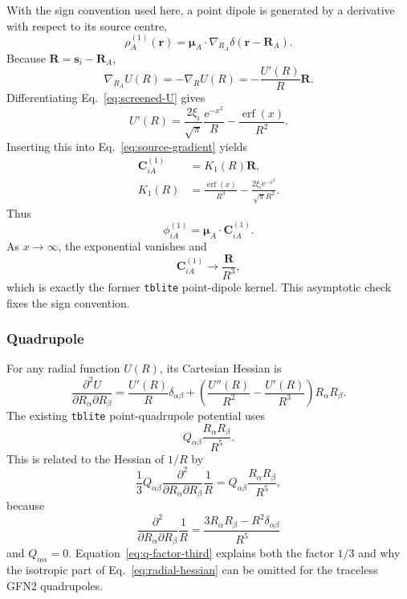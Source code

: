 \documentclass[11pt,a4paper]{article}
\newcommand{\vect}[1]{\bm{#1}}
\newcommand{\erf}{\operatorname{erf}}
\newcommand{\ee}{\mathrm{e}}
\begin{document}
With the sign convention used here, a point dipole is generated by a derivative
with respect to its source centre,
\begin{equation}
 \rho_A^{(1)}(\vect r)
 =\vect\mu_A\mathbin{\cdot}\nabla_{R_A}
   \delta(\vect r-\vect R_A).
\end{equation}
Because $\vect R=\vect s_i-\vect R_A$,
\begin{equation}
 \nabla_{R_A}U(R)=-\nabla_RU(R)=-\frac{U'(R)}{R}\vect R.
 \label{eq:source-gradient}
\end{equation}
Differentiating Eq.~\eqref{eq:screened-U} gives
\begin{equation}
 U'(R)=\frac{2\xi_i}{\sqrt\pi}\frac{\ee^{-x^2}}{R}
       -\frac{\erf(x)}{R^2}.
\end{equation}
Inserting this into Eq.~\eqref{eq:source-gradient} yields
\begin{align}
 \vect C_{iA}^{(1)}&=K_1(R)\vect R,\\
 K_1(R)&=
 \frac{\erf(x)}{R^3}
 -\frac{2\xi_i\ee^{-x^2}}{\sqrt\pi R^2}.
 \label{eq:k1}
\end{align}
Thus
\begin{equation}
 \phi_{iA}^{(1)}=\vect\mu_A\mathbin{\cdot}\vect C_{iA}^{(1)}.
\end{equation}
As $x\to\infty$, the exponential vanishes and
\begin{equation}
 \vect C_{iA}^{(1)}\longrightarrow\frac{\vect R}{R^3},
\end{equation}
which is exactly the former \texttt{tblite} point-dipole kernel.  This
asymptotic check fixes the sign convention.

\subsubsection*{Quadrupole}

For any radial function $U(R)$, its Cartesian Hessian is
\begin{equation}
 \frac{\partial^2U}{\partial R_\alpha\partial R_\beta}
 =\frac{U'(R)}{R}\delta_{\alpha\beta}
 +\left(\frac{U''(R)}{R^2}-\frac{U'(R)}{R^3}\right)
 R_\alpha R_\beta.
 \label{eq:radial-hessian}
\end{equation}
The existing \texttt{tblite} point-quadrupole potential uses
\begin{equation}
 Q_{\alpha\beta}\frac{R_\alpha R_\beta}{R^5}.
 \label{eq:tblite-point-q}
\end{equation}
This is related to the Hessian of $1/R$ by
\begin{equation}
 \frac13 Q_{\alpha\beta}
 \frac{\partial^2}{\partial R_\alpha\partial R_\beta}\frac1R
 =Q_{\alpha\beta}\frac{R_\alpha R_\beta}{R^5},
 \label{eq:q-factor-third}
\end{equation}
because
\begin{equation}
 \frac{\partial^2}{\partial R_\alpha\partial R_\beta}\frac1R
 =\frac{3R_\alpha R_\beta-R^2\delta_{\alpha\beta}}{R^5}
\end{equation}
and $Q_{\alpha\alpha}=0$.  Equation~\eqref{eq:q-factor-third} explains both
the factor $1/3$ and why the isotropic part of Eq.~\eqref{eq:radial-hessian}
can be omitted for the traceless GFN2 quadrupoles.
\end{document}
